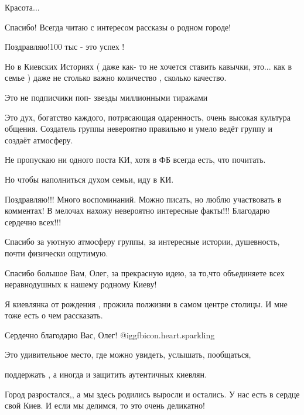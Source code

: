 \begin{itemize}
\begin{itemize}
\end{itemize} %

Красота...

Спасибо! Всегда читаю с интересом рассказы о родном городе!


Поздравляю!100 тыс - это успех !

Но в Киевских Историях ( даже как- то не хочется ставить кавычки, это... как в
семье ) даже не столько важно количество , сколько качество.

Это не подписчики поп- звезды миллионными тиражами

Это дух, богатство каждого, потрясающая одаренность, очень высокая культура
общения. Создатель группы невероятно правильно и умело ведёт группу и создаёт
атмосферу.

Не пропускаю ни одного поста КИ, хотя в ФБ всегда есть, что почитать.

Но чтобы наполниться духом семьи, иду в КИ.


Поздравляю!!! Много воспоминаний. Можно писать, но люблю участвовать в
комментах! В мелочах нахожу невероятно интересные факты!!! Благодарю сердечно
всех!!!


Спасибо за уютную атмосферу группы, за интересные истории, душевность, почти физически ощутимую.


Спасибо большое Вам, Олег, за прекрасную идею, за то,что объединяете всех неравнодушных к нашему родному Киеву!

Я киевлянка от рождения , прожила полжизни в самом центре столицы. И мне тоже есть о чем рассказать.


Сердечно благодарю Вас, Олег!  @igg{fbicon.heart.sparkling} 

Это удивительное место, где можно увидеть, услышать, пообщаться,

поддержать , а иногда и защитить аутентичных киевлян.

Город разростался,, а мы здесь родились выросли и остались. У нас есть в сердце
свой Киев. И если мы делимся, то это очень деликатно!


\end{itemize}
